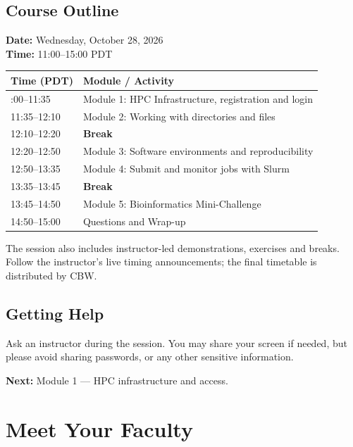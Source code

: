 \documentclass[
]{book}
\newcounter{none} %
\begin{document}
\section*{Course Outline}\label{course-outline}

\textbf{Date:} Wednesday, October 28, 2026\\
\textbf{Time:} 11:00--15:00 PDT

{\def\LTcaptype{none} %
\begin{longtable}[]{@{}ll@{}}
\toprule\noalign{}
Time (PDT) & Module / Activity \\
\midrule\noalign{}
\endhead
\bottomrule\noalign{}
\endlastfoot
11:00--11:35 & Module 1: HPC Infrastructure, registration and login \\
11:35--12:10 & Module 2: Working with directories and files \\
12:10--12:20 & \textbf{Break} \\
12:20--12:50 & Module 3: Software environments and reproducibility \\
12:50--13:35 & Module 4: Submit and monitor jobs with Slurm \\
13:35--13:45 & \textbf{Break} \\
13:45--14:50 & Module 5: Bioinformatics Mini-Challenge \\
14:50--15:00 & Questions and Wrap-up \\
\end{longtable}
}

The session also includes instructor-led demonstrations, exercises and breaks. Follow the instructor's live timing announcements; the final timetable is distributed by CBW.

\section*{Getting Help}\label{getting-help}

Ask an instructor during the session. You may share your screen if needed, but please avoid sharing passwords, or any other sensitive information.

\textbf{Next:} Module 1 --- HPC infrastructure and access.

\chapter{Meet Your Faculty}\label{meet-your-faculty}
\end{document}
